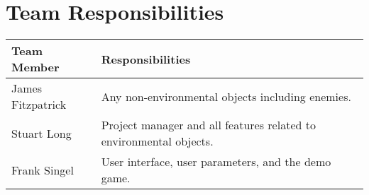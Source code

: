 \documentclass[pdftex,12pt,letter]{article}
\begin{document}
\section{Team Responsibilities}
\begin{table}[!h]
\begin{tabularx}{\textwidth }[t]{|l|Y|}
\hline
\bfseries Team Member & \bfseries Responsibilities\\\hline
James Fitzpatrick & Any non-environmental objects including enemies.\\\hline
Stuart Long & Project manager and all features related to environmental objects.\\\hline
Frank Singel & User interface, user parameters, and the demo game.\\\hline
\end{tabularx}
\end{table}
\end{document}
